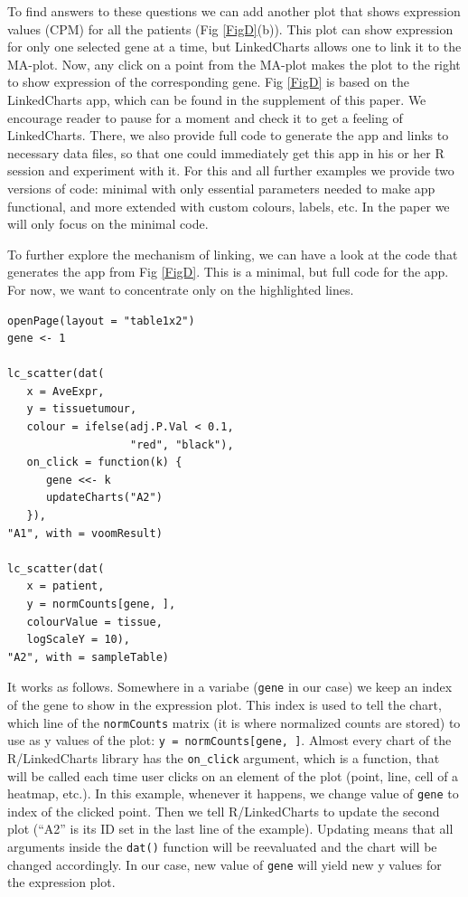 \documentclass[twocolumn,10pt]{article}
\begin{document}
To find answers to these questions we can add another plot that shows expression values (CPM) for all the patients (Fig \ref{FigD}(b)). This plot can show expression for only one selected gene at a time, but LinkedCharts allows one to link it to the MA-plot. Now, any click on a point from the MA-plot makes the plot to the right to show expression of the corresponding gene. Fig \ref{FigD} is based on the LinkedCharts app, which can be found in the supplement of this paper. We encourage reader to pause for a moment and check it to get a feeling of LinkedCharts. There, we also provide full code to generate the app and links to necessary data files, so that one could immediately get this app in his or her R session and experiment with it. For this and all further examples we provide two versions of code: minimal with only essential parameters needed to make app functional, and more extended with custom colours, labels, etc. In the paper we will only focus on the minimal code.

To further explore the mechanism of linking, we can have a look at the code that generates the app from Fig \ref{FigD}. This is a minimal, but full code for the app. For now, we want to concentrate only on the highlighted lines.

\begin{verbatim}
openPage(layout = "table1x2")
gene <- 1

lc_scatter(dat(
   x = AveExpr,
   y = tissuetumour,
   colour = ifelse(adj.P.Val < 0.1, 
                   "red", "black"),
   on_click = function(k) {
      gene <<- k
      updateCharts("A2")
   }),
"A1", with = voomResult)

lc_scatter(dat(
   x = patient,
   y = normCounts[gene, ],
   colourValue = tissue, 
   logScaleY = 10),
"A2", with = sampleTable)
\end{verbatim}

It works as follows. Somewhere in a variabe (\texttt{gene} in our case) we keep an index of the gene to show in the expression plot. This index is used to tell the chart, which line of the \texttt{normCounts} matrix (it is where normalized counts are stored) to use as y values of the plot: \texttt{y = normCounts[gene, ]}. Almost every chart of the R/LinkedCharts library has the \texttt{on_click} argument, which is a function, that will be called each time user clicks on an element of the plot (point, line, cell of a heatmap, etc.). In this example, whenever it happens, we change value of \texttt{gene} to index of the clicked point. Then we tell R/LinkedCharts to update the second plot (``A2'' is its ID set in the last line of the example). Updating means that all arguments inside the \texttt{dat()} function will be reevaluated and the chart will be changed accordingly. In our case, new value of \texttt{gene} will yield new y values for the expression plot.
\end{document}
